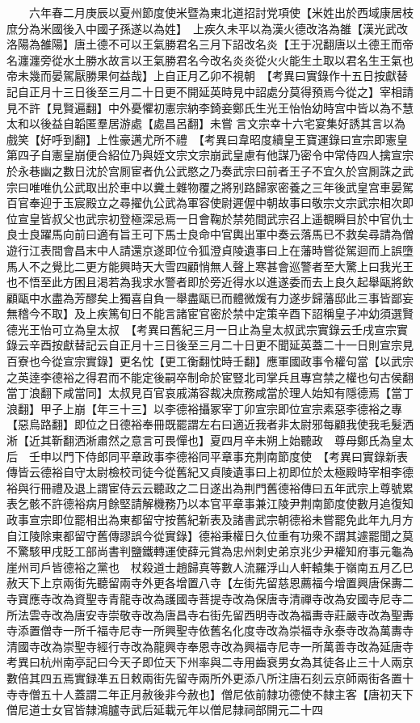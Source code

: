　　六年春二月庚辰以夏州節度使米暨為東北道招討党項使【米姓出於西域康居枝庶分為米國後入中國子孫遂以為姓】　上疾久未平以為漢火德改洛為雒【漢光武改洛陽為雒陽】唐土德不可以王氣勝君名三月下詔改名炎【王于况翻唐以土德王而帝名瀍瀍旁從水土勝水故言以王氣勝君名今改名炎炎從火火能生土取以君名生王氣也帝未幾而晏駕厭勝果何益哉】上自正月乙卯不視朝　【考異曰實錄作十五日按獻替記自正月十三日後至三月二十日更不開延英時見中詔處分莫得預焉今從之】宰相請見不許【見賢遍翻】中外憂懼初憲宗納李錡妾鄭氏生光王怡怡幼時宫中皆以為不慧太和以後益自韜匿羣居游處【處昌呂翻】未嘗言文宗幸十六宅宴集好誘其言以為戲笑【好呼到翻】上性豪邁尤所不禮　【考異曰韋昭度續皇王寶運錄曰宣宗即憲皇第四子自憲皇崩便合紹位乃與姪文宗文宗崩武皇慮有他謀乃密令中常侍四人擒宣宗於永巷幽之數日沈於宫厠宦者仇公武愍之乃奏武宗曰前者王子不宜久於宫厠誅之武宗曰唯唯仇公武取出於車中以糞土雜物覆之將别路歸家密養之三年後武皇宫車晏駕百官奉迎于玉宸殿立之尋擢仇公武為軍容使尉遲偓中朝故事曰敬宗文宗武宗相次即位宣皇皆叔父也武宗初登極深忌焉一日會鞠於禁苑間武宗召上遥覩瞬目於中官仇士良士良躍馬向前曰適有旨王可下馬士良命中官輿出軍中奏云落馬已不救矣尋請為僧遊行江表間會昌末中人請還京遂即位令狐澄貞陵遺事曰上在藩時嘗從駕迴而上誤墮馬人不之覺比二更方能興時天大雪四顧悄無人聲上寒甚會巡警者至大驚上曰我光王也不悟至此方困且渇若為我求水警者即於旁近得水以進遂委而去上良久起舉甌將飲顧甌中水盡為芳醪矣上獨喜自負一舉盡甌已而體微煖有力遂步歸藩邸此三事皆鄙妄無稽今不取】及上疾篤旬日不能言諸宦官密於禁中定策辛酉下詔稱皇子冲幼須選賢德光王怡可立為皇太叔　【考異曰舊紀三月一日止為皇太叔武宗實錄云壬戌宣宗實錄云辛酉按獻替記云自正月十三日後至三月二十日更不聞延英蓋二十一日則宣宗見百寮也今從宣宗實錄】更名忱【更工衡翻忱時壬翻】應軍國政事令權句當【以武宗之英逹李德裕之得君而不能定後嗣卒制命於宦豎北司掌兵且專宫禁之權也句古侯翻當丁浪翻下咸當同】太叔見百官哀戚滿容裁决庶務咸當於理人始知有隱德焉【當丁浪翻】甲子上崩【年三十三】以李德裕攝冢宰丁卯宣宗即位宣宗素惡李德裕之專【惡烏路翻】即位之日德裕奉冊既罷謂左右曰適近我者非太尉邪每顧我使我毛髮洒淅【近其靳翻洒淅肅然之意言可畏憚也】夏四月辛未朔上始聽政　尊母鄭氏為皇太后　壬申以門下侍郎同平章政事李德裕同平章事充荆南節度使　【考異曰實錄新表傳皆云德裕自守太尉檢校司徒今從舊紀又貞陵遺事曰上初即位於太極殿時宰相李德裕與行冊禮及退上謂宦侍云云聽政之二日遂出為荆門舊德裕傳曰五年武宗上尊號累表乞骸不許德裕病月餘堅請解機務乃以本官平章事兼江陵尹荆南節度使數月追復知政事宣宗即位罷相出為東都留守按舊紀新表及諸書武宗朝德裕未嘗罷免此年九月方自江陵除東都留守舊傳謬誤今從實錄】德裕秉權日久位重有功衆不謂其遽罷聞之莫不驚駭甲戌貶工部尚書判鹽鐵轉運使薛元賞為忠州刺史弟京兆少尹權知府事元龜為崖州司戶皆德裕之黨也　杖殺道士趙歸真等數人流羅浮山人軒轅集于嶺南五月乙巳赦天下上京兩街先聽留兩寺外更各增置八寺【左街先留慈恩薦福今增置興唐保夀二寺寶應寺改為資聖寺青龍寺改為護國寺菩提寺改為保唐寺清禪寺改為安國寺尼寺二所法雲寺改為唐安寺崇敬寺改為唐昌寺右街先留西明寺改為福夀寺莊嚴寺改為聖夀寺添置僧寺一所千福寺尼寺一所興聖寺依舊名化度寺改為崇福寺永泰寺改為萬夀寺清國寺改為崇聖寺經行寺改為龍興寺奉恩寺改為興福寺尼寺一所萬善寺改為延唐寺　考異曰杭州南亭記曰今天子即位天下州率與二寺用齒衰男女為其徒各止三十人兩京數倍其四五焉實録凖五日敕兩街先留寺兩所外更添八所注唐石刻云京師兩街各置十寺寺僧五十人蓋謂二年正月赦後非今赦也】僧尼依前隸功德使不隸主客【唐初天下僧尼道士女官皆隸鴻臚寺武后延載元年以僧尼隸祠部開元二十四